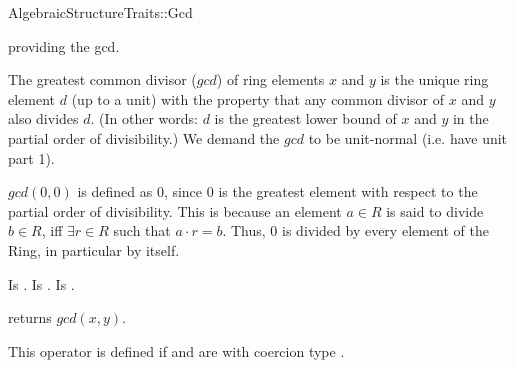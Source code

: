 \begin{ccRefFunctionObjectConcept}{AlgebraicStructureTraits::Gcd}

\ccDefinition

 providing the gcd. 

The greatest common divisor ($gcd$) of ring elements $x$ and $y$ is the unique 
ring element $d$ (up to a unit) with the property that any common divisor of 
$x$ and $y$ also divides $d$. (In other words: $d$ is the greatest lower bound 
of $x$ and $y$ in the partial order of divisibility.) We demand the $gcd$ to be 
unit-normal (i.e. have unit part 1). 

$gcd(0,0)$ is defined as $0$, since $0$ is the greatest element with respect 
to the partial order of divisibility. This is because an element $a \in R$ is said to divide $b \in R$, iff $\exists r \in R$ such that $a \cdot r = b$. 
Thus, $0$ is divided by every element of the Ring, in particular by itself. 

\ccRefines 


\ccTypes
{} 
        { Is .}
\ccGlue
{} 
        { Is .}
\ccGlue
{} 
        { Is .}

\ccOperations
{}

        { returns  $gcd(x,y)$. }

         {This operator is defined if  and  are  
          with coercion type . }


\ccSeeAlso


\end{ccRefFunctionObjectConcept} 

